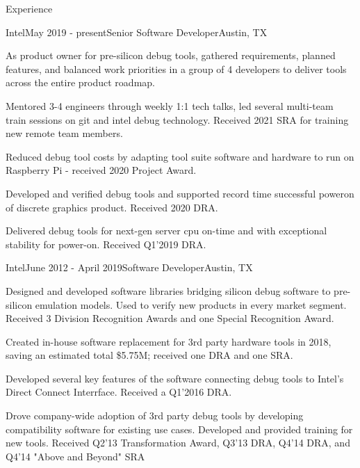 \documentclass{resume} %
\begin{document}
\begin{rSection}{Experience}

\begin{rSubsection}{Intel}{May 2019 - present}{Senior Software Developer}{Austin, TX}
\item As product owner for pre-silicon debug tools, gathered requirements, planned features, and balanced work priorities in a group of 4 developers to deliver tools across the entire product roadmap.
\item Mentored 3-4 engineers through weekly 1:1 tech talks, led several multi-team train sessions on git and intel debug technology. Received 2021 SRA for training new remote team members.
\item Reduced debug tool costs by adapting tool suite software and hardware to run on Raspberry Pi - received 2020 Project Award.
\item Developed and verified debug tools and supported record time successful poweron of discrete graphics product. Received 2020 DRA.
\item Delivered debug tools for next-gen server cpu on-time and with exceptional stability for power-on. Received Q1'2019 DRA.
\end{rSubsection}

\begin{rSubsection}{Intel}{June 2012 - April 2019}{Software Developer}{Austin, TX}
\item Designed and developed software libraries bridging silicon debug software to pre-silicon emulation models. Used to verify new products in every market segment. Received 3 Division Recognition Awards and one Special Recognition Award.
\item Created in-house software replacement for 3rd party hardware tools in 2018, saving an estimated total \$5.75M; received one DRA and one SRA.
\item Developed several key features of the software connecting debug tools to Intel's Direct Connect Interrface. Received a Q1'2016 DRA.
\item Drove company-wide adoption of 3rd party debug tools by developing compatibility software for existing use cases. Developed and provided training for new tools. Received Q2'13 Transformation Award, Q3'13 DRA, Q4'14 DRA, and Q4'14 "Above and Beyond" SRA
\end{rSubsection}

\end{rSection}

\end{document}

